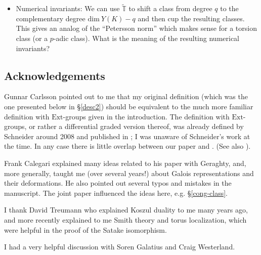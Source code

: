 \documentclass[10pt]{amsart}
\newcommand{\Ext}{\mathrm{Ext}}
\newcommand{\gHecke}{\tilde{\mathbb{T}}}
\renewcommand{\dim}{\mathrm{dim}}
\theoremstyle{remark}
\begin{document}
\begin{itemize}
Our expection is that $\tilde{R}$ will have better integral properties than $\gHecke$, in general. 
 
%
%
%
%
%
%
%
%
%
   
   \item[(d)] Numerical invariants: We can use $\gHecke$ to shift a class from degree $q$ to the complementary degree $\dim \ Y(K) - q$  and then cup
 the resulting classes. This gives an analog of the ``Petersson norm'' which makes sense for a torsion class (or a $p$-adic class).
What is the meaning of the resulting numerical invariants? 
   

   
%
%
%
%
%
%
%
    

 
  
  
%
%
%
%
%
%
%
%
%
%
%
 
 \end{itemize}
 
 \subsection{Acknowledgements}

  Gunnar Carlsson  pointed out to me that my original definition (which was the one presented below in \S \ref{desc2}) should be equivalent
to the much more familiar definition with $\Ext$-groups given in the introduction.   The definition with 
$\mathrm{Ext}$-groups, or rather a differential graded version thereof,
was already defined  by Schneider around 2008 and published in \cite{Schneider}; I was unaware of Schneider's work at the time. In any case
there is little overlap between our paper and \cite{Schneider}. (See also \cite{SchneiderOllivier}). 

  Frank Calegari explained many ideas related to his paper \cite{CG} with Geraghty,  and, more generally, 
  taught me (over several years!) about  Galois representations and their deformations.  He also pointed out several typos and mistakes in the manuscript.    
The joint paper \cite{CaVe} influenced the ideas here,  e.g.  \S \ref{cong-class}.

 
    I thank David Treumann who explained Koszul duality to me many years ago, and more recently explained to me
 Smith theory and torus localization, which were helpful in the proof of the Satake isomorphism. 
  
  I had a very helpful discussion with Soren Galatius and Craig Westerland. 
  
  
  
\end{document}
